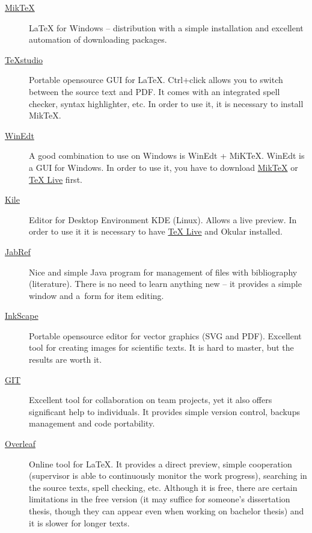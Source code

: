 \begin{description}
   \item[\href{http://miktex.org/download}{MikTeX}] \LaTeX{} for Windows -- distribution with a simple installation and excellent automation of downloading packages.
   \item[\href{http://texstudio.sourceforge.net/}{TeXstudio}] Portable opensource GUI for \LaTeX{}. Ctrl+click allows you to switch between the source text and PDF. It comes with an integrated spell checker, syntax highlighter, etc. In order to use it, it is necessary to install MikTeX.
    \item[\href{http://www.winedt.com/}{WinEdt}] A good combination to use on Windows is WinEdt + MiKTeX. WinEdt is a GUI for Windows. In order to use it, you have to download \href{http://miktex.org/download}{MikTeX} or  \href{http://www.tug.org/texlive/}{TeX Live} first. 
  \item[\href{http://kile.sourceforge.net/}{Kile}] Editor for Desktop Environment KDE (Linux). Allows a live preview. In order to use it it is necessary to have \href{http://www.tug.org/texlive/}{TeX Live} and Okular installed. 
   \item[\href{http://jabref.sourceforge.net/download.php}{JabRef}] Nice and simple Java program for management of files with bibliography (literature). There is no need to learn anything new -- it provides a simple window and a~form for item editing.
   \item[\href{https://inkscape.org/en/download/}{InkScape}] Portable opensource editor for vector graphics (SVG and PDF). Excellent tool for creating images for scientific texts. It is hard to master, but the results are worth it.
   \item[\href{https://git-scm.com/}{GIT}] Excellent tool for collaboration on team projects, yet it also offers significant help to individuals. It provides simple version control, backups management and code portability.
   \item[\href{http://www.overleaf.com/}{Overleaf}] Online tool for \LaTeX{}. It provides a direct preview, simple cooperation (supervisor is able to continuously monitor the work progress), searching in the source texts, spell checking, etc. Although it is free, there are certain limitations in the free version (it may suffice for someone's dissertation thesis, though they can appear even when working on bachelor thesis) and it is slower for longer texts.
\end{description}

